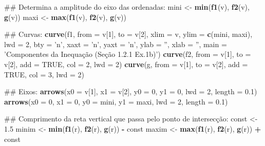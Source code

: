 \documentclass[]{book}
\newenvironment{Shaded}{\begin{snugshade}}{\end{snugshade}}
\newcommand{\KeywordTok}[1]{\textcolor[rgb]{0.13,0.29,0.53}{\textbf{#1}}}
\newcommand{\DataTypeTok}[1]{\textcolor[rgb]{0.13,0.29,0.53}{#1}}
\newcommand{\DecValTok}[1]{\textcolor[rgb]{0.00,0.00,0.81}{#1}}
\newcommand{\FloatTok}[1]{\textcolor[rgb]{0.00,0.00,0.81}{#1}}
\newcommand{\StringTok}[1]{\textcolor[rgb]{0.31,0.60,0.02}{#1}}
\newcommand{\OtherTok}[1]{\textcolor[rgb]{0.56,0.35,0.01}{#1}}
\newcommand{\OperatorTok}[1]{\textcolor[rgb]{0.81,0.36,0.00}{\textbf{#1}}}
\newcommand{\NormalTok}[1]{#1}
\begin{document}
\begin{enumerate}
\begin{Shaded}
\begin{Highlighting}[]
\NormalTok{##  Determina  a amplitude do eixo das ordenadas:}
\NormalTok{mini <-}\StringTok{ }\KeywordTok{min}\NormalTok{(}\KeywordTok{f1}\NormalTok{(v), }\KeywordTok{f2}\NormalTok{(v), }\KeywordTok{g}\NormalTok{(v))}
\NormalTok{maxi <-}\StringTok{ }\KeywordTok{max}\NormalTok{(}\KeywordTok{f1}\NormalTok{(v), }\KeywordTok{f2}\NormalTok{(v), }\KeywordTok{g}\NormalTok{(v))}

\NormalTok{##  Curvas:}
\KeywordTok{curve}\NormalTok{(f1, }\DataTypeTok{from =}\NormalTok{ v[}\DecValTok{1}\NormalTok{], }\DataTypeTok{to =}\NormalTok{ v[}\DecValTok{2}\NormalTok{], }\DataTypeTok{xlim =}\NormalTok{ v, }\DataTypeTok{ylim =} \KeywordTok{c}\NormalTok{(mini, maxi), }\DataTypeTok{lwd =} \DecValTok{2}\NormalTok{,}
  \DataTypeTok{bty =} \StringTok{'n'}\NormalTok{, }\DataTypeTok{xaxt =} \StringTok{'n'}\NormalTok{, }\DataTypeTok{yaxt =} \StringTok{'n'}\NormalTok{, }\DataTypeTok{ylab =} \StringTok{''}\NormalTok{, }\DataTypeTok{xlab =} \StringTok{''}\NormalTok{,}
  \DataTypeTok{main =} \StringTok{'Componentes da Inequação (Seção 1.2.1 Ex.1b)'}\NormalTok{)}
\KeywordTok{curve}\NormalTok{(f2, }\DataTypeTok{from =}\NormalTok{ v[}\DecValTok{1}\NormalTok{], }\DataTypeTok{to =}\NormalTok{ v[}\DecValTok{2}\NormalTok{], }\DataTypeTok{add =} \OtherTok{TRUE}\NormalTok{, }\DataTypeTok{col =} \DecValTok{2}\NormalTok{, }\DataTypeTok{lwd =} \DecValTok{2}\NormalTok{)}
\KeywordTok{curve}\NormalTok{(g, }\DataTypeTok{from =}\NormalTok{ v[}\DecValTok{1}\NormalTok{], }\DataTypeTok{to =}\NormalTok{ v[}\DecValTok{2}\NormalTok{], }\DataTypeTok{add =} \OtherTok{TRUE}\NormalTok{, }\DataTypeTok{col =} \DecValTok{3}\NormalTok{, }\DataTypeTok{lwd =} \DecValTok{2}\NormalTok{)}

\NormalTok{##  Eixos:}
\KeywordTok{arrows}\NormalTok{(}\DataTypeTok{x0 =}\NormalTok{ v[}\DecValTok{1}\NormalTok{], }\DataTypeTok{x1 =}\NormalTok{ v[}\DecValTok{2}\NormalTok{],}
   \DataTypeTok{y0 =} \DecValTok{0}\NormalTok{, }\DataTypeTok{y1 =} \DecValTok{0}\NormalTok{, }\DataTypeTok{lwd =} \DecValTok{2}\NormalTok{, }\DataTypeTok{length =} \FloatTok{0.1}\NormalTok{)}
\KeywordTok{arrows}\NormalTok{(}\DataTypeTok{x0 =} \DecValTok{0}\NormalTok{, }\DataTypeTok{x1 =} \DecValTok{0}\NormalTok{,}
   \DataTypeTok{y0 =}\NormalTok{ mini, }\DataTypeTok{y1 =}\NormalTok{ maxi, }\DataTypeTok{lwd =} \DecValTok{2}\NormalTok{, }\DataTypeTok{length =} \FloatTok{0.1}\NormalTok{)}

\NormalTok{##  Comprimento da reta vertical que passa pelo ponto de intersecção:}
\NormalTok{const <-}\StringTok{ }\FloatTok{1.5}
\NormalTok{minim <-}\StringTok{ }\KeywordTok{min}\NormalTok{(}\KeywordTok{f1}\NormalTok{(r), }\KeywordTok{f2}\NormalTok{(r), }\KeywordTok{g}\NormalTok{(r)) }\OperatorTok{-}\StringTok{ }\NormalTok{const}
\NormalTok{maxim <-}\StringTok{ }\KeywordTok{max}\NormalTok{(}\KeywordTok{f1}\NormalTok{(r), }\KeywordTok{f2}\NormalTok{(r), }\KeywordTok{g}\NormalTok{(r)) }\OperatorTok{+}\StringTok{ }\NormalTok{const}


\end{Highlighting}
\end{Shaded}
\end{enumerate}
\end{document}
